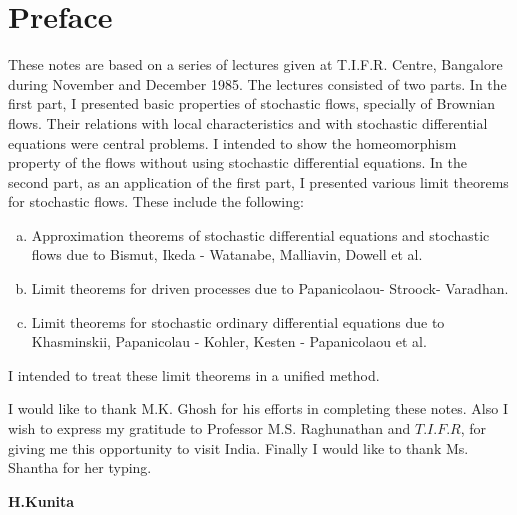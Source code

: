 \eject

\thispagestyle{empty}

\chapter*{Preface}


These notes are based on a series of lectures given at
T.I.F.R. Centre, Bangalore during November and December 1985. The
lectures consisted of two parts. In the first part, I presented basic
properties of stochastic flows, specially of Brownian flows. Their
relations with local characteristics and with stochastic differential
equations were central problems. I intended to show the homeomorphism
property of the flows without using stochastic differential
equations. In the second part, as an application of the first part, I
presented various limit theorems for stochastic flows. These include
the following: 
\begin{enumerate}[(a)]
\item Approximation theorems of stochastic differential equations and\break
  stochastic flows due to Bismut, Ikeda - Watanabe, Malliavin, Dowell
  et al. 
\item Limit theorems for driven processes due to Papanicolaou- Stroock-
  Varadhan. 
\item Limit theorems for stochastic ordinary differential equations
  due to Khasminskii, Papanicolau - Kohler, Kesten - Papanicolaou et
  al. 
\end{enumerate} 	

I intended to treat these limit theorems in a unified method.

I would like to thank M.K. Ghosh for his efforts in completing these
notes. Also I wish to express my gratitude to Professor
M.S. Raghunathan and $T.I.F.R$, for giving me this opportunity to
visit India. Finally I would like to thank Ms. Shantha for her
typing. 
\vskip 1cm

\hfill{\large\bf H.Kunita}

